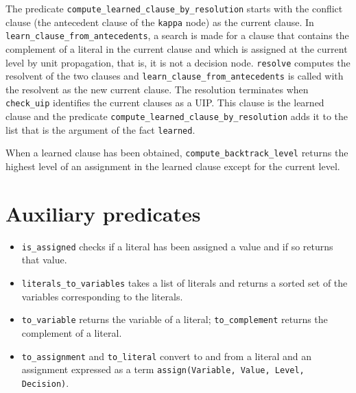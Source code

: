 \documentclass[11pt]{article}
\newcommand*{\p}[1]{\textup{\texttt{#1}}}
\begin{document}
The predicate \p{compute\_learned\_clause\_by\_resolution} starts with
the conflict clause (the antecedent clause of the \p{kappa} node) as the
current clause. In \p{learn\_clause\_from\_antecedents}, a search is made
for a clause that contains the complement of a literal in the current
clause and which is assigned at the current level by unit propagation,
that is, it is not a decision node. \p{resolve} computes the resolvent
of the two clauses and \p{learn\_clause\_from\_antecedents} is called
with the resolvent as the new current clause. The resolution terminates
when \p{check\_uip} identifies the current clauses as a UIP. This clause
is the learned clause and the predicate
\p{compute\_learned\_clause\_by\_resolution} adds it to the list that is
the argument of the fact \p{learned}.

When a learned clause has been obtained, \p{compute\_backtrack\_level}
returns the highest level of an assignment in the learned clause except
for the current level.


\section{Auxiliary predicates}\label{s.aux}

\begin{itemize}

\item \p{is\_assigned} checks if a literal has been assigned a value
and if so returns that value.

\item \p{literals\_to\_variables} takes a list of literals and returns a
sorted set of the variables corresponding to the literals.

\item \p{to\_variable} returns the variable of a literal;
\p{to\_complement} returns the complement of a literal.

\item \p{to\_assignment} and \p{to\_literal} convert to and from a
literal and an assignment expressed as a term \p{assign(Variable, Value,
Level, Decision)}.

\end{itemize}




\end{document}
